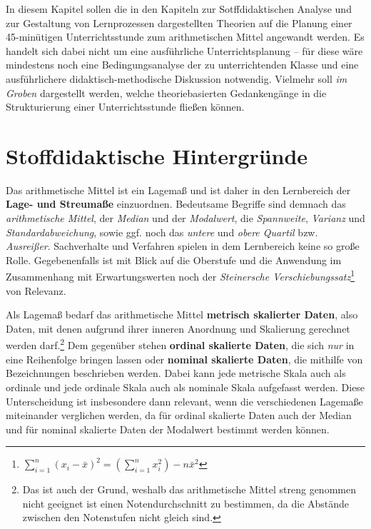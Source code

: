 \documentclass[
]{scrbook}
\theoremstyle{definition}
\theoremstyle{definition}
\theoremstyle{definition}
\theoremstyle{definition}
\theoremstyle{remark}
\begin{document}
In diesem Kapitel sollen die in den Kapiteln zur Sotffdidaktischen Analyse und zur Gestaltung von Lernprozessen dargestellten Theorien auf die Planung einer 45-minütigen Unterrichtsstunde zum arithmetischen Mittel angewandt werden. Es handelt sich dabei nicht um eine ausführliche Unterrichtsplanung -- für diese wäre mindestens noch eine Bedingungsanalyse der zu unterrichtenden Klasse und eine ausführlichere didaktisch-methodische Diskussion notwendig. Vielmehr soll \emph{im Groben} dargestellt werden, welche theoriebasierten Gedankengänge in die Strukturierung einer Unterrichtsstunde fließen können.

\section{Stoffdidaktische Hintergründe}\label{stoffdidaktische-hintergruxfcnde}

Das \textcolor{formalColor}{arithmetische Mittel} ist ein Lagemaß und ist daher in den Lernbereich der \textbf{Lage- und Streumaße} einzuordnen. Bedeutsame Begriffe sind demnach das \emph{arithmetische Mittel}, der \emph{Median} und der \emph{Modalwert}, die \emph{Spannweite}, \emph{Varianz} und \emph{Standardabweichung}, sowie ggf. noch das \emph{untere} und \emph{obere Quartil} bzw. \emph{Ausreißer}. Sachverhalte und Verfahren spielen in dem Lernbereich keine so große Rolle. Gegebenenfalls ist mit Blick auf die Oberstufe und die Anwendung im Zusammenhang mit Erwartungswerten noch der \emph{Steinersche Verschiebungssatz}\footnote{\(\sum\limits_{i=1}^n (x_i-\bar{x})^2 = \left(\sum\limits_{i=1}^nx_i^2\right)-n\bar{x}^2\)} von Relevanz.

Als Lagemaß bedarf das arithmetische Mittel \textbf{metrisch skalierter Daten}, also Daten, mit denen aufgrund ihrer inneren Anordnung und Skalierung gerechnet werden darf.\footnote{Das ist auch der Grund, weshalb das arithmetische Mittel streng genommen nicht geeignet ist einen Notendurchschnitt zu bestimmen, da die Abstände zwischen den Notenstufen nicht gleich sind.} Dem gegenüber stehen \textbf{ordinal skalierte Daten}, die sich \emph{nur} in eine Reihenfolge bringen lassen oder \textbf{nominal skalierte Daten}, die mithilfe von Bezeichnungen beschrieben werden. Dabei kann jede metrische Skala auch als ordinale und jede ordinale Skala auch als nominale Skala aufgefasst werden. Diese Unterscheidung ist insbesondere dann relevant, wenn die verschiedenen Lagemaße miteinander verglichen werden, da für ordinal skalierte Daten auch der Median und für nominal skalierte Daten der Modalwert bestimmt werden können.
\end{document}
